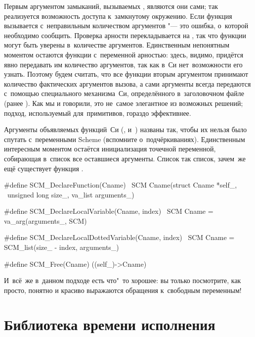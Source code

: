 Первым аргументом замыканий, вызываемых , являются они сами;
так реализуется возможность доступа к~замкнутому окружению. Если функция
вызывается с~неправильным количеством аргументов "--- это ошибка, о~которой
необходимо сообщить. Проверка арности перекладывается на , так
что функции могут быть уверены в~количестве аргументов. Единственным непонятным
моментом остаются функции с~переменной арностью: здесь, видимо, придётся явно
передавать им количество аргументов, так как в~Си нет~возможности его узнать.
Поэтому будем считать, что все функции вторым аргументом принимают количество
фактических аргументов вызова, а сами аргументы всегда передаются с~помощью
специального механизма~Си, определённого в~заголовочном файле 
(ранее ). Как мы и говорили, это не~самое элегантное из
возможных решений; подход, используемый для~примитивов, гораздо эффективнее.

Аргументы объявляемых функций~Си (,  и~)
названы так, чтобы их нельзя было спутать с~переменными Scheme (вспомните
о~подчёркиваниях). Единственным интересным моментом остаётся инициализация
точечной переменной, собирающая в~список все оставшиеся аргументы. Список так
список, зачем~же ещё существует функция .

\begin{code:c}
#define SCM_DeclareFunction(Cname) \
  SCM Cname(struct Cname *self_,   \
            unsigned long size_, va_list arguments_)

#define SCM_DeclareLocalVariable(Cname, index) \
  SCM Cname = va_arg(arguments_, SCM)

#define SCM_DeclareLocalDottedVariable(Cname, index) \
  SCM Cname = SCM_list(size_ - index, arguments_)

#define SCM_Free(Cname) ((self_)->Cname)
\end{code:c}

И~всё~же в~данном подходе есть что"~то хорошее: вы только посмотрите, как
просто, понятно и красиво выражаются обращения к~свободным переменным!


\section{Библиотека времени исполнения}\label{cc/sect:runtime}

